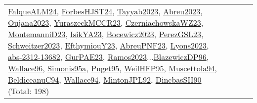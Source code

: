 {\begin{longtable}{p{3cm}r>{\raggedright\arraybackslash}p{6cm}>{\raggedright\arraybackslash}p{6cm}>{\raggedright\arraybackslash}p{8cm}}
\hyperref[detail:FalqueALM24]{FalqueALM24}, \hyperref[detail:ForbesHJST24]{ForbesHJST24}, \hyperref[detail:Tayyab2023]{Tayyab2023}, \hyperref[detail:Abreu2023]{Abreu2023}, \hyperref[detail:Oujana2023]{Oujana2023}, \hyperref[detail:YuraszeckMCCR23]{YuraszeckMCCR23}, \hyperref[detail:CzerniachowskaWZ23]{CzerniachowskaWZ23}, \hyperref[detail:MontemanniD23]{MontemanniD23}, \hyperref[detail:IsikYA23]{IsikYA23}, \hyperref[detail:Bocewicz2023]{Bocewicz2023}, \hyperref[detail:PerezGSL23]{PerezGSL23}, \hyperref[detail:Schweitzer2023]{Schweitzer2023}, \hyperref[detail:EfthymiouY23]{EfthymiouY23}, \hyperref[detail:AbreuPNF23]{AbreuPNF23}, \hyperref[detail:Lyons2023]{Lyons2023}, \hyperref[detail:abs-2312-13682]{abs-2312-13682}, \hyperref[detail:GurPAE23]{GurPAE23}, \hyperref[detail:Ramos2023]{Ramos2023}...\hyperref[detail:BlazewiczDP96]{BlazewiczDP96}, \hyperref[detail:Wallace96]{Wallace96}, \hyperref[detail:Simonis95a]{Simonis95a}, \hyperref[detail:Puget95]{Puget95}, \hyperref[detail:WeilHFP95]{WeilHFP95}, \hyperref[detail:Muscettola94]{Muscettola94}, \hyperref[detail:BeldiceanuC94]{BeldiceanuC94}, \hyperref[detail:Wallace94]{Wallace94}, \hyperref[detail:MintonJPL92]{MintonJPL92}, \hyperref[detail:DincbasSH90]{DincbasSH90} (Total: 198)\\

\end{longtable}}
